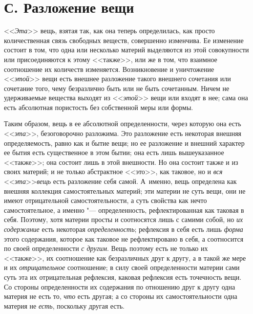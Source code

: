 \section[С. Разложение вещи]{С. Разложение вещи}

<<{\em Эта}>> вещь, взятая
так, как она теперь определилась, как просто количественная связь свободных
веществ, совершенно изменчива. Ее изменение состоит в том, что одна или
несколько материй выделяются из этой совокупности или присоединяются к
этому <<также>>, или же в том, что взаимное соотношение их количеств
изменяется. Возникновение и уничтожение <<{\em этой}>>
вещи есть внешнее разложение такого внешнего сочетания или сочетание того,
чему безразлично быть или не быть сочетанным. Ничем не удерживаемые
вещества выходят из <<{\em этой}>> вещи или входят в нее;
сама она есть абсолютная пористость без собственной меры или формы.

Таким образом, вещь в ее абсолютной определенности, через которую она есть
<<{\em эта}>>, безоговорочно разложима. Это разложение
есть некоторая внешняя определяемость, равно как и бытие вещи; но ее
разложение и внешний характер ее бытия есть существенное в этом бытии; она
есть лишь вышеуказанное <<также>>; она состоит лишь в этой внешности. Но она
состоит также и из своих материй; и не только абстрактное <<это>>, как
таковое, но и {\em вся}
<<{\em эта}>>{\em вещь} есть
разложение себя самой. А~именно, вещь определена как внешняя коллекция
самостоятельных материй; эти материи не суть вещи, они не имеют
отрицательной самостоятельности, а суть свойства как нечто самостоятельное,
а именно "--- определенность, рефлектированная как таковая в себя. Поэтому,
хотя материи просты и соотносятся лишь с самими собой, но
{\em их содержание} есть некоторая
{\em определенность}; рефлексия в себя есть лишь
{\em форма} этого содержания, которое как таковое не
рефлектировано в себя, а соотносится по своей определенности
{\em с другим}. Вещь поэтому есть не только их <<также>>,
их соотношение как безразличных друг к другу, а в такой же мере и их
{\em отрицательное} соотношение; в силу своей
определенности материи сами суть эта их отрицательная рефлексия, каковая
рефлексия есть точечность вещи. Со стороны определенности их содержания по
отношению друг к другу одна материя не есть то,
{\em что} есть другая; а со стороны их
самостоятельности одна материя не {\em есть}, поскольку другая есть.

